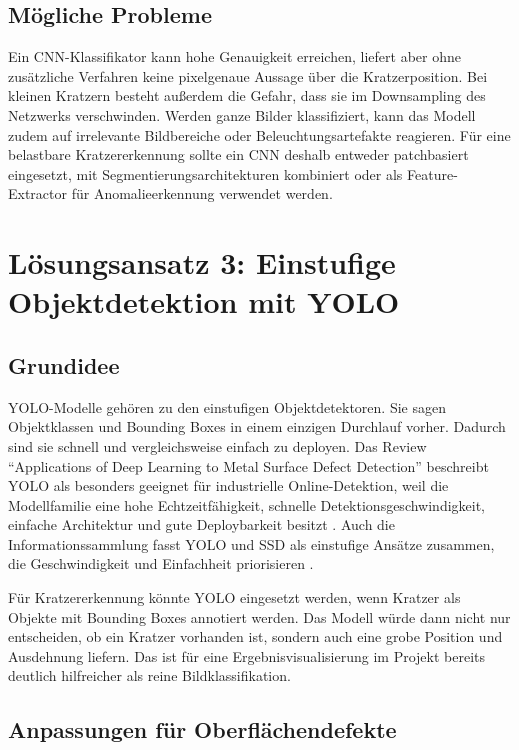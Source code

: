 \documentclass[11pt,a4paper]{article}
\begin{document}
\subsection{Mögliche Probleme}

Ein CNN-Klassifikator kann hohe Genauigkeit erreichen, liefert aber ohne zusätzliche Verfahren keine pixelgenaue Aussage über die Kratzerposition. Bei kleinen Kratzern besteht außerdem die Gefahr, dass sie im Downsampling des Netzwerks verschwinden. Werden ganze Bilder klassifiziert, kann das Modell zudem auf irrelevante Bildbereiche oder Beleuchtungsartefakte reagieren. Für eine belastbare Kratzererkennung sollte ein CNN deshalb entweder patchbasiert eingesetzt, mit Segmentierungsarchitekturen kombiniert oder als Feature-Extractor für Anomalieerkennung verwendet werden.

\section{Lösungsansatz 3: Einstufige Objektdetektion mit YOLO}

\subsection{Grundidee}

YOLO-Modelle gehören zu den einstufigen Objektdetektoren. Sie sagen Objektklassen und Bounding Boxes in einem einzigen Durchlauf vorher. Dadurch sind sie schnell und vergleichsweise einfach zu deployen. Das Review \enquote{Applications of Deep Learning to Metal Surface Defect Detection} beschreibt YOLO als besonders geeignet für industrielle Online-Detektion, weil die Modellfamilie eine hohe Echtzeitfähigkeit, schnelle Detektionsgeschwindigkeit, einfache Architektur und gute Deploybarkeit besitzt \cite{applications_review}. Auch die Informationssammlung fasst YOLO und SSD als einstufige Ansätze zusammen, die Geschwindigkeit und Einfachheit priorisieren \cite{ersteinfos}.

Für Kratzererkennung könnte YOLO eingesetzt werden, wenn Kratzer als Objekte mit Bounding Boxes annotiert werden. Das Modell würde dann nicht nur entscheiden, ob ein Kratzer vorhanden ist, sondern auch eine grobe Position und Ausdehnung liefern. Das ist für eine Ergebnisvisualisierung im Projekt bereits deutlich hilfreicher als reine Bildklassifikation.

\subsection{Anpassungen für Oberflächendefekte}
\end{document}

